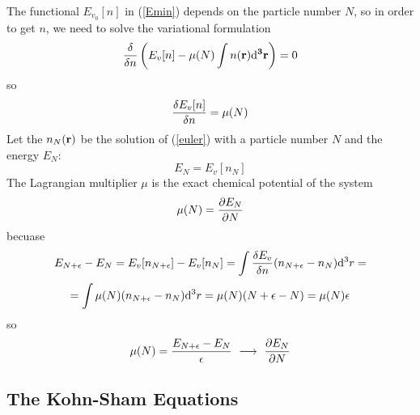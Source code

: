 The functional $E_{v_0}[n]$ in (\ref{Emin}) depends on the particle number $N$, so in order to get $n$, we need to solve the variational formulation 
\begin{equation*}
  {\delta\over\delta n}\left(E_v[n]-\mu(N)\int n(\bf r){\rm d}^3r\right)=0
\end{equation*}
so 
\begin{equation}
  {\delta E_v[n]\over\delta n}=\mu(N)  \label{euler}
\end{equation}
Let the $n_N(\bf r)$ be the solution of (\ref{euler}) with a particle number $N$ and the energy $E_N$: 
\begin{equation*}
  E_N=E_v[n_N]
\end{equation*}
The Lagrangian multiplier $\mu$ is the exact chemical potential of the system 
\begin{equation*}
  \mu(N)={\partial E_N\over\partial N}
\end{equation*}
becuase 
\begin{equation*}
  E_{N+\epsilon}-E_N=E_v[n_{N+\epsilon}]-E_v[n_N] =\int {\delta E_v\over\delta n} (n_{N+\epsilon}-n_N){\rm d}^3r=
\end{equation*}
\begin{equation*}
  =\int \mu(N) (n_{N+\epsilon}-n_N){\rm d}^3r =\mu(N)(N+\epsilon-N)=\mu(N)\epsilon
\end{equation*}
so 
\begin{equation*}
  \mu(N)={E_{N+\epsilon}-E_N\over\epsilon} \ \longrightarrow \ {\partial E_N\over\partial N}
\end{equation*}

\subsection{The Kohn-Sham Equations}

